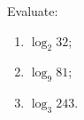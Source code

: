 Evaluate:
\begin{enumerate}
\item[(a)] $\log_2 32$;
\item[(b)] $\log_9 81$;
\item[(c)] $\log_3 243$.
\end{enumerate}

